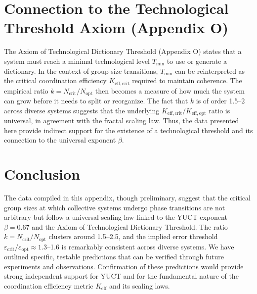 \documentclass[12pt]{article}
\theoremstyle{remark}
\newcommand{\Keff}{K_{\mathrm{eff}}}
\newcommand{\Tmin}{T_{\min}}
\begin{document}
	\section{Connection to the Technological Threshold Axiom (Appendix O)}
	\label{sec:connection}
	
	The Axiom of Technological Dictionary Threshold (Appendix O) states that a system must reach a minimal technological level $\Tmin$ to use or generate a dictionary. In the context of group size transitions, $\Tmin$ can be reinterpreted as the critical coordination efficiency $K_{\mathrm{eff},\text{crit}}$ required to maintain coherence. The empirical ratio $k = N_{\text{crit}}/N_{\text{opt}}$ then becomes a measure of how much the system can grow before it needs to split or reorganize. The fact that $k$ is of order 1.5–2 across diverse systems suggests that the underlying $K_{\mathrm{eff},\text{crit}}/K_{\mathrm{eff},\text{opt}}$ ratio is universal, in agreement with the fractal scaling law. Thus, the data presented here provide indirect support for the existence of a technological threshold and its connection to the universal exponent $\beta$.
	
	\section{Conclusion}
	\label{sec:conclusion}
	
	The data compiled in this appendix, though preliminary, suggest that the critical group sizes at which collective systems undergo phase transitions are not arbitrary but follow a universal scaling law linked to the YUCT exponent $\beta = 0.67$ and the Axiom of Technological Dictionary Threshold. The ratio $k = N_{\text{crit}}/N_{\text{opt}}$ clusters around 1.5–2.5, and the implied error threshold $\varepsilon_{\text{crit}}/\varepsilon_{\text{opt}} \approx 1.3$–1.6 is remarkably consistent across diverse systems. We have outlined specific, testable predictions that can be verified through future experiments and observations. Confirmation of these predictions would provide strong independent support for YUCT and for the fundamental nature of the coordination efficiency metric $\Keff$ and its scaling laws.
	
\end{document}
